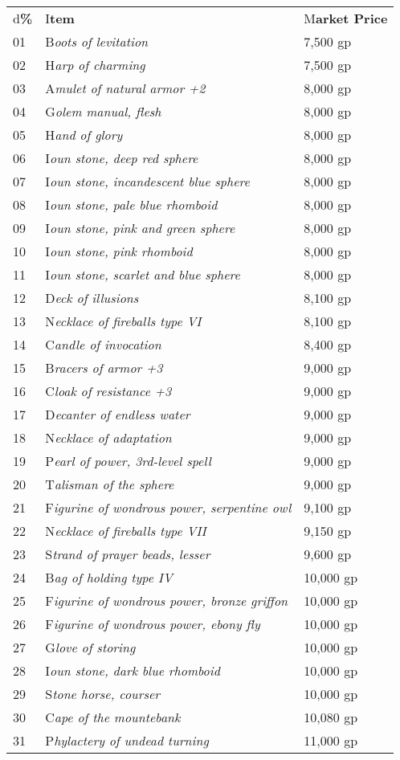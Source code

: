 \documentclass{article}
\begin{document}
\vspace{12pt}
\begin{tabular}{|>{\raggedright}p{14pt}|>{\raggedright}p{183pt}|>{\raggedright}p{55pt}|}
\hline
\multicolumn{3}{|p{253pt}|}{T\textbf{able: Medium Wondrous Items}}\tabularnewline
\hline
d\textbf{\%} & I\textbf{tem} & M\textbf{arket Price}\tabularnewline
\hline
01 & B\textit{oots of levitation} & 7,500 gp\tabularnewline
\hline
02 & H\textit{arp of charming} & 7,500 gp\tabularnewline
\hline
03 & A\textit{mulet of natural armor +2} & 8,000 gp\tabularnewline
\hline
04 & G\textit{olem manual, flesh} & 8,000 gp\tabularnewline
\hline
05 & H\textit{and of glory} & 8,000 gp\tabularnewline
\hline
06 & I\textit{oun stone, deep red sphere} & 8,000 gp\tabularnewline
\hline
07 & I\textit{oun stone, incandescent blue sphere} & 8,000 gp\tabularnewline
\hline
08 & I\textit{oun stone, pale blue rhomboid} & 8,000 gp\tabularnewline
\hline
09 & I\textit{oun stone, pink and green sphere} & 8,000 gp\tabularnewline
\hline
10 & I\textit{oun stone, pink rhomboid} & 8,000 gp\tabularnewline
\hline
11 & I\textit{oun stone, scarlet and blue sphere} & 8,000 gp\tabularnewline
\hline
12 & D\textit{eck of illusions} & 8,100 gp\tabularnewline
\hline
13 & N\textit{ecklace of fireballs type VI} & 8,100 gp\tabularnewline
\hline
14 & C\textit{andle of invocation} & 8,400 gp\tabularnewline
\hline
15 & B\textit{racers of armor +3} & 9,000 gp\tabularnewline
\hline
16 & C\textit{loak of resistance +3} & 9,000 gp\tabularnewline
\hline
17 & D\textit{ecanter of endless water} & 9,000 gp\tabularnewline
\hline
18 & N\textit{ecklace of adaptation} & 9,000 gp\tabularnewline
\hline
19 & P\textit{earl of power, 3rd-level spell} & 9,000 gp\tabularnewline
\hline
20 & T\textit{alisman of the sphere} & 9,000 gp\tabularnewline
\hline
21 & F\textit{igurine of wondrous power, serpentine owl} & 9,100 gp\tabularnewline
\hline
22 & N\textit{ecklace of fireballs type VII} & 9,150 gp\tabularnewline
\hline
23 & S\textit{trand of prayer beads, lesser} & 9,600 gp\tabularnewline
\hline
24 & B\textit{ag of holding type IV} & 10,000 gp\tabularnewline
\hline
25 & F\textit{igurine of wondrous power, bronze griffon} & 10,000 gp\tabularnewline
\hline
26 & F\textit{igurine of wondrous power, ebony fly} & 10,000 gp\tabularnewline
\hline
27 & G\textit{love of storing} & 10,000 gp\tabularnewline
\hline
28 & I\textit{oun stone, dark blue rhomboid} & 10,000 gp\tabularnewline
\hline
29 & S\textit{tone horse, courser} & 10,000 gp\tabularnewline
\hline
30 & C\textit{ape of the mountebank} & 10,080 gp\tabularnewline
\hline
31 & P\textit{hylactery of undead turning} & 11,000 gp\tabularnewline

\end{tabular}
\end{document}

